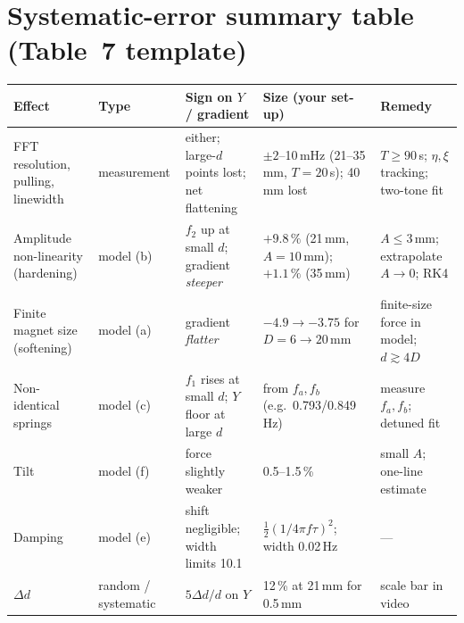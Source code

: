 \documentclass[11pt,a4paper]{article}
\newcommand{\Y}{Y}                       %
\begin{document}
\section{Systematic-error summary table (Table~7 template)}\label{sec:errtable}
\begin{center}\small
\begin{tabular}{@{}p{3.0cm} p{1.9cm} p{3.2cm} p{3.4cm} p{3.5cm}@{}}
\toprule
Effect & Type & Sign on $\Y$ / gradient & Size (your set-up) & Remedy \\
\midrule
FFT resolution, pulling, linewidth & measurement & either; large-$d$ points lost; net flattening & $\pm2$--10\,mHz (21--35\,mm, $T=20$\,s); 40\,mm lost & $T\ge90$\,s; $\eta,\xi$ tracking; two-tone fit \\
Amplitude non-linearity (hardening) & model (b) & $f_2$ up at small $d$; gradient \emph{steeper} & $+9.8\,\%$ (21\,mm, $A=10$\,mm); $+1.1\,\%$ (35\,mm) & $A\le3$\,mm; extrapolate $A\to0$; RK4 \\
Finite magnet size (softening) & model (a) & gradient \emph{flatter} & $-4.9\to-3.75$ for $D=6\to20$\,mm & finite-size force in model; $d\gtrsim4D$ \\
Non-identical springs & model (c) & $f_1$ rises at small $d$; $\Y$ floor at large $d$ & from $f_a,f_b$ (e.g.\ 0.793/0.849\,Hz) & measure $f_a,f_b$; detuned fit \\
Tilt & model (f) & force slightly weaker & 0.5--1.5\,\% & small $A$; one-line estimate \\
Damping & model (e) & shift negligible; width limits 10.1 & $\tfrac12(1/4\pi f\tau)^2$; width 0.02\,Hz & --- \\
$\Delta d$ & random / systematic & $5\Delta d/d$ on $\Y$ & 12\,\% at 21\,mm for 0.5\,mm & scale bar in video \\
\bottomrule
\end{tabular}
\end{center}

\end{document}
